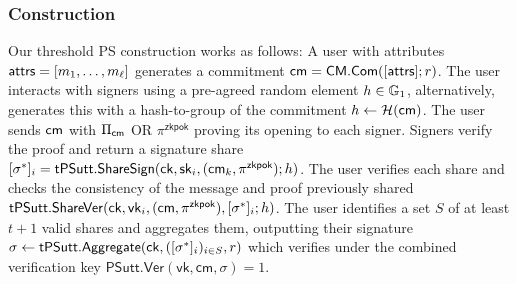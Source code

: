 \subsubsection{Construction}\label{threshold-ps-construction}


Our threshold PS construction works as follows:
A user with attributes $\mathsf{attrs} = [m_1, \ldots, m_\ell]$ generates a commitment $\mathsf{cm} = \mathsf{CM.Com}([\mathsf{attrs}];r)$. The user interacts with signers using a pre-agreed random element $h \in \mathbb{G}_1$, alternatively, \cite{sonnino_coconut_2020} generates this with a hash-to-group of the commitment $h \gets \mathcal{H}(\mathsf{cm})$. The user sends $\mathsf{cm}$ with $\Pi_{\mathsf{cm}}$ OR $\pi^{\mathsf{zkpok}}$ proving its opening to each signer. Signers verify the proof and return a signature share $[\sigma^*]_i = \mathsf{tPSutt.ShareSign}(\mathsf{ck}, \mathsf{sk}_i, (\mathsf{cm}_k, \pi^{\mathsf{zkpok}}); h)$. The user verifies each share and checks the consistency of the message and proof previously shared $\mathsf{tPSutt.ShareVer}(\mathsf{ck}, \mathsf{vk}_i, (\mathsf{cm}, \pi^{\mathsf{zkpok}}), [\sigma^*]_i; h)$. The user identifies a set $S$ of at least $t+1$ valid shares and aggregates them, outputting their signature $\sigma \leftarrow \mathsf{tPSutt.Aggregate}(\mathsf{ck}, ([\sigma^*]_i)_{i \in S}, r)$ which verifies under the combined  verification key $\mathsf{PSutt.Ver}(\mathsf{vk}, \mathsf{cm}, \sigma) = 1$.


